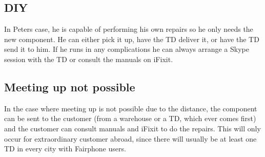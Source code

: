 \documentclass[final,a4paper]{report} %
\begin{document}
	\subsection{DIY}
	In Peters case, he is capable of performing his own repairs so he only needs the new component. He can either pick it up, have the TD deliver it, or have the TD send it to him. If he runs in any complications he can always arrange a Skype session with the TD or consult the manuals on iFixit.
	
	\subsection{Meeting up not possible}
	In the case where meeting up is not possible due to the distance, the component can be sent to the customer (from a warehouse or a TD, which ever comes first) and the customer can consult manuals and iFixit to do the repairs. This will only occur for extraordinary customer abroad, since there will usually be at least one TD in every city with Fairphone users.
\end{document}
